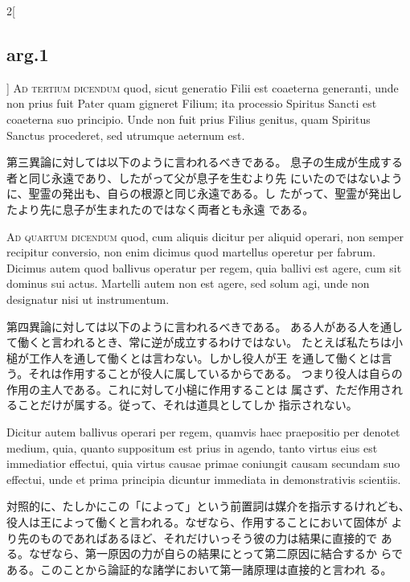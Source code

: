 \documentclass[paper=a4paper,fontsize=10pt,jafontsize=9pt,titlepage]{jlreq}
\begin{document}
\begin{paracol}{2}[\subsection{arg.1}]
{\scshape Ad tertium dicendum} quod, sicut generatio Filii est coaeterna
generanti, unde non prius fuit Pater quam gigneret Filium; ita
processio  Spiritus Sancti est coaeterna suo principio. Unde non fuit
prius Filius genitus, quam Spiritus Sanctus procederet,
sed utrumque aeternum est.

\switchcolumn

第三異論に対しては以下のように言われるべきである。
息子の生成が生成する者と同じ永遠であり、したがって父が息子を生むより先
 にいたのではないように、聖霊の発出も、自らの根源と同じ永遠である。し
 たがって、聖霊が発出したより先に息子が生まれたのではなく両者とも永遠
 である。

\switchcolumn*[\subsection{ad.4}]

{\scshape Ad quartum dicendum} quod, cum aliquis dicitur per aliquid operari, non
semper recipitur conversio, non enim dicimus quod martellus operetur
per fabrum. Dicimus autem quod ballivus operatur per regem, quia
ballivi est agere, cum sit dominus sui actus. Martelli autem non est
agere, sed solum agi, unde non designatur nisi ut
instrumentum.

\switchcolumn

第四異論に対しては以下のように言われるべきである。
ある人がある人を通して働くと言われるとき、常に逆が成立するわけではない。
 たとえば私たちは小槌が工作人を通して働くとは言わない。しかし役人が王
 を通して働くとは言う。それは作用することが役人に属しているからである。
 つまり役人は自らの作用の主人である。これに対して小槌に作用することは
 属さず、ただ作用されることだけが属する。従って、それは道具としてしか
 指示されない。

\switchcolumn*

Dicitur autem ballivus operari per regem, quamvis haec
praepositio per denotet medium, quia, quanto suppositum est prius in
agendo, tanto virtus eius est immediatior effectui, quia virtus causae
primae coniungit causam secundam suo effectui, unde et prima principia
dicuntur immediata in demonstrativis scientiis.

\switchcolumn

対照的に、たしかにこの「によって」という前置詞は媒介を指示するけれども、
 役人は王によって働くと言われる。なぜなら、作用することにおいて固体が
 より先のものであればあるほど、それだけいっそう彼の力は結果に直接的で
 ある。なぜなら、第一原因の力が自らの結果にとって第二原因に結合するか
 らである。このことから論証的な諸学において第一諸原理は直接的と言われ
 る。


\end{paracol}
\end{document}
